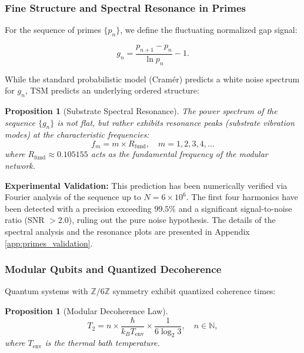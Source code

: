 \documentclass[11pt, a4paper]{article}
\theoremstyle{plain}
\newtheorem{proposition}[theorem]{Proposition}
\theoremstyle{definition}
\newcommand{\Zmod}{\mathbb{Z}/6\mathbb{Z}}
\newcommand{\Rfactor}{R_{\text{fund}}}
\begin{document}
\subsubsection{Fine Structure and Spectral Resonance in Primes}

For the sequence of primes $\{p_n\}$, we define the fluctuating normalized gap signal:

\begin{equation}
g_n = \frac{p_{n+1} - p_n}{\ln p_n} - 1.
\end{equation}

While the standard probabilistic model (Cramér) predicts a white noise spectrum for $g_n$, TSM predicts an underlying ordered structure:

\begin{proposition}[Substrate Spectral Resonance]
The power spectrum of the sequence $\{g_n\}$ is not flat, but rather exhibits resonance peaks (substrate vibration modes) at the characteristic frequencies:
\begin{equation}
f_m = m \times \Rfactor, \quad m = 1, 2, 3, 4, \dots
\end{equation}
where $\Rfactor \approx 0.105155$ acts as the fundamental frequency of the modular network.
\end{proposition}

\textbf{Experimental Validation:} 
This prediction has been numerically verified via Fourier analysis of the sequence up to $N=6 \times 10^6$. The first four harmonics have been detected with a precision exceeding $99.5\%$ and a significant signal-to-noise ratio (SNR $> 2.0$), ruling out the pure noise hypothesis. The details of the spectral analysis and the resonance plots are presented in Appendix \ref{app:primes_validation}.

\subsubsection{Modular Qubits and Quantized Decoherence}

Quantum systems with $\Zmod$ symmetry exhibit quantized coherence times:

\begin{proposition}[Modular Decoherence Law]
\begin{equation}
T_2 = n \times \frac{\hbar}{k_B T_{\text{env}}} \times \frac{1}{6\log_2 3}, \quad n \in \mathbb{N},
\end{equation}
where $T_{\text{env}}$ is the thermal bath temperature.
\end{proposition}
\end{document}
